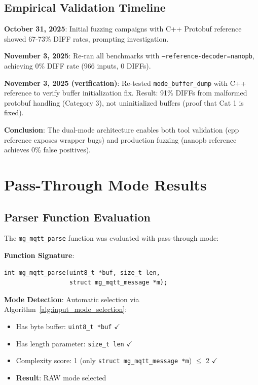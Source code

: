 \documentclass[doublespace,nopageskip]{VTthesis}
\begin{document}
\subsection{Empirical Validation Timeline}

\textbf{October 31, 2025}: Initial fuzzing campaigns with C++ Protobuf reference showed 67-73\% DIFF rates, prompting investigation.

\textbf{November 3, 2025}: Re-ran all benchmarks with \texttt{--reference-decoder=nanopb}, achieving 0\% DIFF rate (966 inputs, 0 DIFFs).

\textbf{November 3, 2025 (verification)}: Re-tested \texttt{mode\_buffer\_dump} with C++ reference to verify buffer initialization fix. Result: 91\% DIFFs from malformed protobuf handling (Category 3), not uninitialized buffers (proof that Cat 1 is fixed).

\textbf{Conclusion}: The dual-mode architecture enables both tool validation (cpp reference exposes wrapper bugs) and production fuzzing (nanopb reference achieves 0\% false positives).

\section{Pass-Through Mode Results} \label{se:pass_through_results}

\subsection{Parser Function Evaluation}

The \texttt{mg\_mqtt\_parse} function was evaluated with pass-through mode:

\textbf{Function Signature}:
\begin{verbatim}
int mg_mqtt_parse(uint8_t *buf, size_t len,
                  struct mg_mqtt_message *m);
\end{verbatim}

\textbf{Mode Detection}: Automatic selection via Algorithm~\ref{alg:input_mode_selection}:
\begin{itemize}
    \item Has byte buffer: \texttt{uint8\_t *buf} $\checkmark$
    \item Has length parameter: \texttt{size\_t len} $\checkmark$
    \item Complexity score: 1 (only \texttt{struct mg\_mqtt\_message *m}) $\leq$ 2 $\checkmark$
    \item \textbf{Result}: RAW mode selected
\end{itemize}
\end{document}
